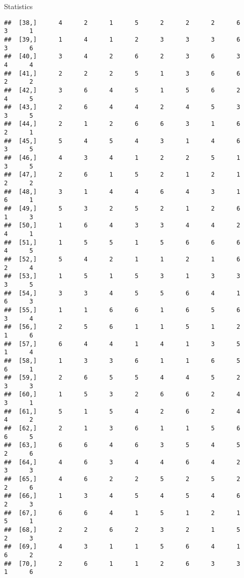\documentclass[
  ignorenonframetext,
]{beamer}
\begin{document}
\begin{frame}[fragile]{Statistics}
\begin{verbatim}
##  [38,]      4      2      1      5      2      2      2      6      3      1
##  [39,]      1      4      1      2      3      3      3      6      3      6
##  [40,]      3      4      2      6      2      3      6      3      4      4
##  [41,]      2      2      2      5      1      3      6      6      2      2
##  [42,]      3      6      4      5      1      5      6      2      4      5
##  [43,]      2      6      4      4      2      4      5      3      3      5
##  [44,]      2      1      2      6      6      3      1      6      2      1
##  [45,]      5      4      5      4      3      1      4      6      3      5
##  [46,]      4      3      4      1      2      2      5      1      3      5
##  [47,]      2      6      1      5      2      1      2      1      2      2
##  [48,]      3      1      4      4      6      4      3      1      6      1
##  [49,]      5      3      2      5      2      1      2      6      1      3
##  [50,]      1      6      4      3      3      4      4      2      4      1
##  [51,]      1      5      5      1      5      6      6      6      4      5
##  [52,]      5      4      2      1      1      2      1      6      2      4
##  [53,]      1      5      1      5      3      1      3      3      3      5
##  [54,]      3      3      4      5      5      6      4      1      6      3
##  [55,]      1      1      6      6      1      6      5      6      3      4
##  [56,]      2      5      6      1      1      5      1      2      1      6
##  [57,]      6      4      4      1      4      1      3      5      1      4
##  [58,]      1      3      3      6      1      1      6      5      6      1
##  [59,]      2      6      5      5      4      4      5      2      3      3
##  [60,]      1      5      3      2      6      6      2      4      3      1
##  [61,]      5      1      5      4      2      6      2      4      4      2
##  [62,]      2      1      3      6      1      1      5      6      6      5
##  [63,]      6      6      4      6      3      5      4      5      2      6
##  [64,]      4      6      3      4      4      6      4      2      3      3
##  [65,]      4      6      2      2      5      2      5      2      2      6
##  [66,]      1      3      4      5      4      5      4      6      2      3
##  [67,]      6      6      4      1      5      1      2      1      5      1
##  [68,]      2      2      6      2      3      2      1      5      2      3
##  [69,]      4      3      1      1      5      6      4      1      6      2
##  [70,]      2      6      1      1      2      6      3      3      1      6

\end{verbatim}
\end{frame}
\end{document}
